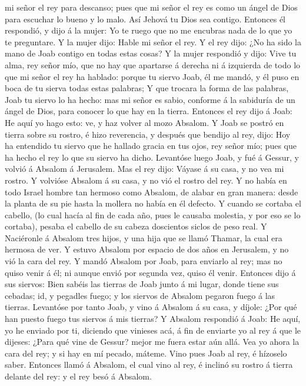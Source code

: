 mi señor el rey para descanso; pues que mi señor el rey es como un ángel
de Dios para escuchar lo bueno y lo malo. Así Jehová tu Dios sea
contigo.  Entonces él respondió, y dijo á la mujer: Yo te
ruego que no me encubras nada de lo que yo te preguntare. Y la mujer
dijo: Hable mi señor el rey.  Y el rey dijo: ¿No ha sido
la mano de Joab contigo en todas estas cosas? Y la mujer respondió y
dijo: Vive tu alma, rey señor mío, que no hay que apartarse á derecha ni
á izquierda de todo lo que mi señor el rey ha hablado: porque tu siervo
Joab, él me mandó, y él puso en boca de tu sierva todas estas palabras;
 Y que trocara la forma de las palabras, Joab tu siervo
lo ha hecho: mas mi señor es sabio, conforme á la sabiduría de un ángel
de Dios, para conocer lo que hay en la tierra.  Entonces
el rey dijo á Joab: He aquí yo hago esto: ve, y haz volver al mozo
Absalom.  Y Joab se postró en tierra sobre su rostro, é
hizo reverencia, y después que bendijo al rey, dijo: Hoy ha entendido tu
siervo que he hallado gracia en tus ojos, rey señor mío; pues que ha
hecho el rey lo que su siervo ha dicho.  Levantóse luego
Joab, y fué á Gessur, y volvió á Absalom á Jerusalem. 
Mas el rey dijo: Váyase á su casa, y no vea mi rostro. Y volvióse
Absalom á su casa, y no vió el rostro del rey.  Y no
había en todo Israel hombre tan hermoso como Absalom, de alabar en gran
manera: desde la planta de su pie hasta la mollera no había en él
defecto.  Y cuando se cortaba el cabello, (lo cual hacía
al fin de cada año, pues le causaba molestia, y por eso se lo cortaba),
pesaba el cabello de su cabeza doscientos siclos de peso real.
 Y Naciéronle á Absalom tres hijos, y una hija que se
llamó Thamar, la cual era hermosa de ver.  Y estuvo
Absalom por espacio de dos años en Jerusalem, y no vió la cara del rey.
 Y mandó Absalom por Joab, para enviarlo al rey; mas no
quiso venir á él; ni aunque envió por segunda vez, quiso él venir.
 Entonces dijo á sus siervos: Bien sabéis las tierras de
Joab junto á mi lugar, donde tiene sus cebadas; id, y pegadles fuego; y
los siervos de Absalom pegaron fuego á las tierras. 
Levantóse por tanto Joab, y vino á Absalom á su casa, y díjole: ¿Por qué
han puesto fuego tus siervos á mis tierras?  Y Absalom
respondió á Joab: He aquí, yo he enviado por ti, diciendo que vinieses
acá, á fin de enviarte yo al rey á que le dijeses: ¿Para qué vine de
Gessur? mejor me fuera estar aún allá. Vea yo ahora la cara del rey; y
si hay en mí pecado, máteme.  Vino pues Joab al rey, é
hízoselo saber. Entonces llamó á Absalom, el cual vino al rey, é inclinó
su rostro á tierra delante del rey: y el rey besó á Absalom.

